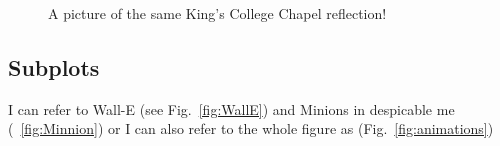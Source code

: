\documentclass{report}
\begin{document}
\begin{figure}[h!]
  \centering
  \caption{A picture of the same King's College
  			Chapel reflection!}
\end{figure}

\clearpage
\begin{landscape}
\section*{Subplots}
I can refer to Wall-E (see Fig.~\ref{fig:WallE}) and Minions in despicable me (~\ref{fig:Minnion}) or I can also refer to the whole figure as (Fig.~\ref{fig:animations})


\end{landscape}
\end{document}
